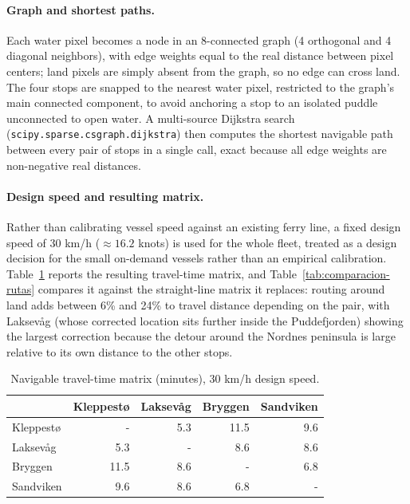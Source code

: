 \documentclass[11pt,a4paper]{article}
\begin{document}
\paragraph{Graph and shortest paths.} Each water pixel becomes a node in an 8-connected graph (4 orthogonal and 4 diagonal neighbors), with edge weights equal to the real distance between pixel centers; land pixels are simply absent from the graph, so no edge can cross land. The four stops are snapped to the nearest water pixel, restricted to the graph's main connected component, to avoid anchoring a stop to an isolated puddle unconnected to open water. A multi-source Dijkstra search (\texttt{scipy.sparse.csgraph.dijkstra}) then computes the shortest navigable path between every pair of stops in a single call, exact because all edge weights are non-negative real distances.

\paragraph{Design speed and resulting matrix.} Rather than calibrating vessel speed against an existing ferry line, a fixed design speed of 30 km/h ($\approx 16.2$ knots) is used for the whole fleet, treated as a design decision for the small on-demand vessels rather than an empirical calibration. Table~\ref{tab:matriz-tiempos} reports the resulting travel-time matrix, and Table~\ref{tab:comparacion-rutas} compares it against the straight-line matrix it replaces: routing around land adds between 6\% and 24\% to travel distance depending on the pair, with Laksevåg (whose corrected location sits further inside the Puddefjorden) showing the largest correction because the detour around the Nordnes peninsula is large relative to its own distance to the other stops.

\begin{table}[H]
\centering
\caption{Navigable travel-time matrix (minutes), 30 km/h design speed.}
\label{tab:matriz-tiempos}
\begin{tabular}{lrrrr}
\toprule
 & Kleppestø & Laksevåg & Bryggen & Sandviken \\
\midrule
Kleppestø & - & 5.3 & 11.5 & 9.6 \\
Laksevåg  & 5.3 & - & 8.6 & 8.6 \\
Bryggen   & 11.5 & 8.6 & - & 6.8 \\
Sandviken & 9.6 & 8.6 & 6.8 & - \\
\bottomrule
\end{tabular}
\end{table}
\end{document}
